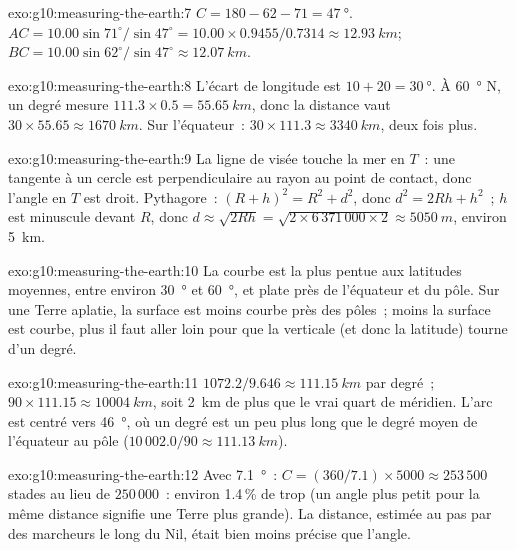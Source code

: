\begin{solution}{exo:g10:measuring-the-earth:7}
$C = 180 - 62 - 71 = \qty{47}{\degree}$.
$AC = 10.00 \sin 71^\circ/\sin 47^\circ = 10.00 \times 0.9455/0.7314 \approx
\qty{12.93}{km}$; $BC = 10.00 \sin 62^\circ/\sin 47^\circ \approx
\qty{12.07}{km}$.
\end{solution}

\begin{solution}{exo:g10:measuring-the-earth:8}
L'écart de longitude est $10 + 20 = \qty{30}{\degree}$. À
\qty{60}{\degree} N, un degré mesure $111.3 \times 0.5 = \qty{55.65}{km}$,
donc la distance vaut $30 \times 55.65 \approx \qty{1670}{km}$. Sur
l'équateur~: $30 \times 111.3 \approx \qty{3340}{km}$, deux fois plus.
\end{solution}

\begin{solution}{exo:g10:measuring-the-earth:9}
La ligne de visée touche la mer en $T$~: une tangente à un cercle est
perpendiculaire au rayon au point de contact, donc l'angle en $T$ est
droit. Pythagore~: $(R+h)^2 = R^2 + d^2$, donc $d^2 = 2Rh + h^2$~; $h$ est
minuscule devant $R$, donc $d \approx \sqrt{2Rh} = \sqrt{2 \times
6\,371\,000 \times 2} \approx \qty{5050}{m}$, environ \qty{5}{km}.
\end{solution}

\begin{solution}{exo:g10:measuring-the-earth:10}
La courbe est la plus pentue aux latitudes moyennes, entre environ
\qty{30}{\degree} et \qty{60}{\degree}, et plate près de l'équateur et du
pôle. Sur une Terre aplatie, la surface est moins courbe près des pôles~;
moins la surface est courbe, plus il faut aller loin pour que la verticale
(et donc la latitude) tourne d'un degré.
\end{solution}

\begin{solution}{exo:g10:measuring-the-earth:11}
$1072.2/9.646 \approx \qty{111.15}{km}$ par degré~; $90 \times 111.15
\approx \qty{10004}{km}$, soit \qty{2}{km} de plus que le vrai quart de
méridien. L'arc est centré vers \qty{46}{\degree}, où un degré est un peu
plus long que le degré moyen de l'équateur au pôle
($10\,002.0/90 \approx \qty{111.13}{km}$).
\end{solution}

\begin{solution}{exo:g10:measuring-the-earth:12}
Avec \qty{7.1}{\degree}~: $C = (360/7.1) \times 5000 \approx 253\,500$ stades
au lieu de $250\,000$~: environ 1.4\,\% de trop (un angle plus petit pour la
même distance signifie une Terre plus grande). La distance, estimée au pas
par des marcheurs le long du Nil, était bien moins précise que l'angle.
\end{solution}

